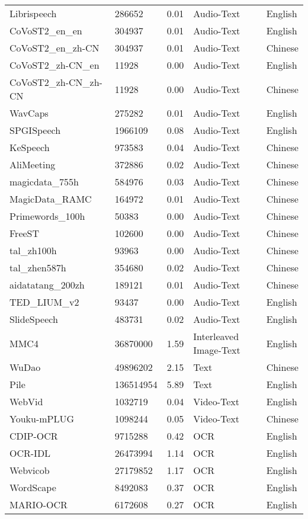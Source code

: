 \begin{table}[h]
\begin{tabular}{l|l|l|l|l}
Librispeech~\cite{Librispeech} & 286652 &0.01 & Audio-Text & English \\
CoVoST2\_en\_en~\cite{CoVoST2} & 304937 & 0.01& Audio-Text & English \\
CoVoST2\_en\_zh-CN~\cite{CoVoST2} & 304937 &0.01 & Audio-Text & Chinese \\
CoVoST2\_zh-CN\_en~\cite{CoVoST2} & 11928 & 0.00& Audio-Text & English \\
CoVoST2\_zh-CN\_zh-CN~\cite{CoVoST2} & 11928 & 0.00& Audio-Text & Chinese \\
WavCaps~\cite{WavCaps} & 275282 & 0.01& Audio-Text & English \\
SPGISpeech~\cite{SPGISpeech} & 1966109 &0.08 & Audio-Text & English \\
KeSpeech~\cite{KeSpeech} & 973583 & 0.04& Audio-Text & Chinese \\
AliMeeting~\cite{AliMeeting} & 372886 &0.02& Audio-Text & Chinese \\
magicdata\_755h~\cite{MagicData_RAMC} & 584976 &0.03& Audio-Text & Chinese \\
MagicData\_RAMC~\cite{MagicData_RAMC} & 164972 &0.01 & Audio-Text & Chinese \\
Primewords\_100h~\cite{Primewords_100h} & 50383 & 0.00& Audio-Text & Chinese \\
FreeST~\cite{FreeST} & 102600 & 0.00& Audio-Text & Chinese \\
tal\_zh100h~\cite{TAL} & 93963 & 0.00& Audio-Text & Chinese \\
tal\_zhen587h~\cite{TAL} & 354680 & 0.02& Audio-Text & Chinese \\
aidatatang\_200zh~\cite{aidatatang_200zh} & 189121 & 0.01& Audio-Text & Chinese \\
TED\_LIUM\_v2~\cite{TED_LIUM} & 93437 & 0.00& Audio-Text & English \\
SlideSpeech~\cite{SlideSpeech} & 483731 & 0.02& Audio-Text & English \\
MMC4~\cite{zhu2024multimodal} & 36870000 & 1.59& Interleaved Image-Text & English \\
WuDao~\cite{yuan2021wudaocorpora} & 49896202 & 2.15& Text & Chinese \\
Pile~\cite{gao2020pile} & 136514954 & 5.89& Text & English \\
WebVid~\cite{bain2021frozen} & 1032719 & 0.04& Video-Text & English \\
Youku-mPLUG~\cite{xu2023youku} & 1098244 & 0.05& Video-Text & Chinese \\
CDIP-OCR~\cite{soboroff2022complex} & 9715288 & 0.42& OCR & English \\
OCR-IDL~\cite{biten2022ocr} & 26473994 & 1.14& OCR & English \\
Webvicob~\cite{kim2023web} & 27179852 & 1.17& OCR & English \\
WordScape~\cite{weber2023wordscape} & 8492083 & 0.37& OCR & English \\
MARIO-OCR~\cite{chen2024textdiffuser} & 6172608 & 0.27& OCR & English \\
\hline
\end{tabular}
\end{table}


